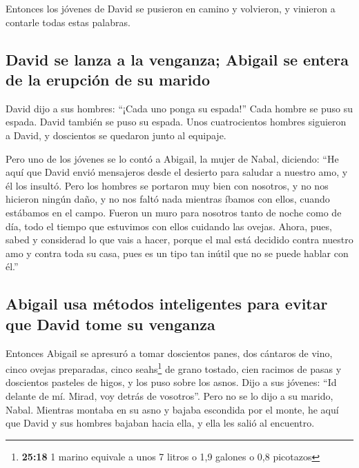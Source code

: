  Entonces los jóvenes de David se pusieron en camino y
volvieron, y vinieron a contarle todas estas palabras.

\hypertarget{david-se-lanza-a-la-venganza-abigail-se-entera-de-la-erupciuxf3n-de-su-marido}{%
\subsection{David se lanza a la venganza; Abigail se entera de la
erupción de su
marido}\label{david-se-lanza-a-la-venganza-abigail-se-entera-de-la-erupciuxf3n-de-su-marido}}

 David dijo a sus hombres: ``¡Cada uno ponga su espada!''
Cada hombre se puso su espada. David también se puso su espada. Unos
cuatrocientos hombres siguieron a David, y doscientos se quedaron junto
al equipaje.

 Pero uno de los jóvenes se lo contó a Abigail, la mujer
de Nabal, diciendo: ``He aquí que David envió mensajeros desde el
desierto para saludar a nuestro amo, y él los insultó. 
Pero los hombres se portaron muy bien con nosotros, y no nos hicieron
ningún daño, y no nos faltó nada mientras íbamos con ellos, cuando
estábamos en el campo.  Fueron un muro para nosotros
tanto de noche como de día, todo el tiempo que estuvimos con ellos
cuidando las ovejas.  Ahora, pues, sabed y considerad lo
que vais a hacer, porque el mal está decidido contra nuestro amo y
contra toda su casa, pues es un tipo tan inútil que no se puede hablar
con él.''

\hypertarget{abigail-usa-muxe9todos-inteligentes-para-evitar-que-david-tome-su-venganza}{%
\subsection{Abigail usa métodos inteligentes para evitar que David tome
su
venganza}\label{abigail-usa-muxe9todos-inteligentes-para-evitar-que-david-tome-su-venganza}}

 Entonces Abigail se apresuró a tomar doscientos panes,
dos cántaros de vino, cinco ovejas preparadas, cinco seahs\footnote{\textbf{25:18}
  1 marino equivale a unos 7 litros o 1,9 galones o 0,8 picotazos} de
grano tostado, cien racimos de pasas y doscientos pasteles de higos, y
los puso sobre los asnos.  Dijo a sus jóvenes: ``Id
delante de mí. Mirad, voy detrás de vosotros''. Pero no se lo dijo a su
marido, Nabal.  Mientras montaba en su asno y bajaba
escondida por el monte, he aquí que David y sus hombres bajaban hacia
ella, y ella les salió al encuentro.

